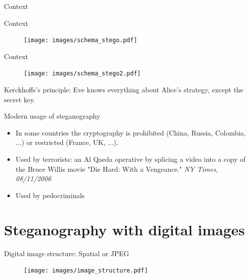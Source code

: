 \documentclass[10pt]{beamer}
\begin{document}
\begin{frame}{Context}
\end{frame}

\begin{frame}{Context}
\begin{figure}[h]
\texttt{[image: images/schema\_stego.pdf]}
\end{figure}
\end{frame}

\begin{frame}{Context}
\begin{figure}[h]
\texttt{[image: images/schema\_stego2.pdf]}
\end{figure}
\pause
\alert{Kerckhoffs’s principle}: Eve knows everything about Alice's strategy, except the secret key.
\end{frame}

\begin{frame}{Modern usage of steganography}
\begin{itemize}
    \item In some countries the cryptography is prohibited (China, Russia, Colombia, ...) or restricted (France, UK, ...). 
    \item Used by terrorists: an Al Qaeda operative by splicing a video into a copy of the Bruce Willis movie "Die Hard:
    With a Vengeance." \textit{NY Times, 08/11/2006}
    \item Used by pedocriminals
\end{itemize}
\end{frame}




\section{Steganography with digital images}



\begin{frame}{Digital image structure: Spatial or JPEG}

\begin{figure}[h]
\texttt{[image: images/image\_structure.pdf]}
\end{figure}
\end{frame}
\end{document}

